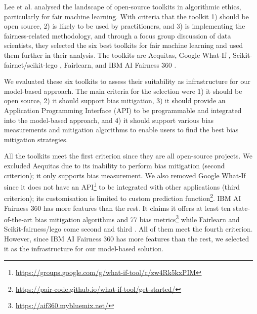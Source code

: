 \documentclass[sigconf]{acmart}
\begin{document}
{		Lee et al. \cite{lee2021landscape} analysed the landscape of open-source toolkits in algorithmic ethics, particularly for fair machine learning. With criteria that the toolkit 1) should be open source, 2) is likely to be used by practitioners, and 3) is implementing the fairness-related methodology, and through a focus group discussion of data scientists, they selected the six best toolkits for fair machine learning and used them further in their analysis. The toolkits are Aequitas\cite{saleiro2019aequitas}, Google What-If \cite{googlewhatif2020}, Scikit-fairnet/scikit-lego \cite{scikitfairness2022,scikitlego2022}, Fairlearn\cite{bird2020fairlearn}, and IBM AI Fairness 360 \cite{bellamy2018ai}.  
		
		We evaluated these six toolkits to assess their suitability as infrastructure for our model-based approach. The main criteria for the selection were 1) it should be open source, 2) it should support bias mitigation, 3) it should provide an Application Programming Interface (API) to be programmable and integrated into the model-based approach, and 4) it should support various bias measurements and mitigation algorithms to enable users to find the best bias mitigation strategies. 
		
		All the toolkits meet the first criterion since they are all open-source projects. We excluded Aequitas due to its inability to perform bias mitigation (second criterion); it only supports bias measurement. We also removed Google What-If since it does not have an API\footnote{\url{https://groups.google.com/g/what-if-tool/c/zw4Rk5kxPIM}} to be integrated with other applications (third criterion); its customisation is limited to custom prediction function\footnote{\url{https://pair-code.github.io/what-if-tool/get-started/}}. IBM AI Fairness 360 has more features than the rest. It claims it offers at least ten state-of-the-art bias mitigation algorithms and 77 bias metrics\footnote{\url{https://aif360.mybluemix.net/}} while Fairlearn and Scikit-fairness/lego come second and third \cite{lee2021landscape}. All of them meet the fourth criterion. However, since IBM AI Fairness 360 has more features than the rest, we selected it as the infrastructure for our model-based solution.
		
		
		
}
\end{document}
